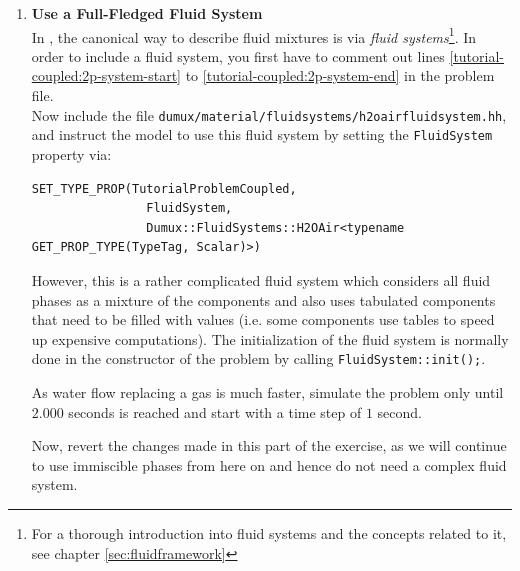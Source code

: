\begin{enumerate}
\item \textbf{Use a Full-Fledged Fluid System} \\
  In \eWoms, the canonical way to describe fluid mixtures is via
  \textit{fluid systems}\footnote{For a thorough introduction into
    fluid systems and the concepts related to it, see chapter
    \ref{sec:fluidframework}}.  In order to include a fluid system,
  you first have to comment out lines
  \ref{tutorial-coupled:2p-system-start}
  to \ref{tutorial-coupled:2p-system-end} in the problem file.\\
  Now include the file
  \texttt{dumux/material/fluidsystems/h2oairfluidsystem.hh}, and
  instruct the model to use this fluid system by setting
  the \texttt{FluidSystem} property via:\\
\begin{lstlisting}[style=eWomsCode]
  SET_TYPE_PROP(TutorialProblemCoupled, 
                FluidSystem,
                Dumux::FluidSystems::H2OAir<typename GET_PROP_TYPE(TypeTag, Scalar)>)
\end{lstlisting}
However, this is a rather complicated fluid system which considers all
fluid phases as a mixture of the components and also uses tabulated
components that need to be filled with values (i.e. some components
use tables to speed up expensive computations).  The initialization of
the fluid system is normally done in the constructor of the problem by
calling \texttt{FluidSystem::init();}.

As water flow replacing a gas is much faster, simulate the problem
only until $2.000$ seconds is reached and start with a time step of
$1$ second.

Now, revert the changes made in this part of the exercise, as we will
continue to use immiscible phases from here on and hence do not need a
complex fluid system.


\end{enumerate}
